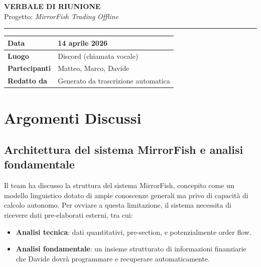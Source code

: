 \documentclass[12pt, a4paper]{article}
\begin{document}
\begin{center}
  {\LARGE\bfseries\color{primary} VERBALE DI RIUNIONE}\\[0.4cm]
  {\large Progetto: \textit{MirrorFish Trading Offline}}\\[0.2cm]
  \textcolor{darkgray}{\rule{0.6\textwidth}{0.4pt}}
\end{center}

\vspace{0.5cm}

\begin{center}
\begin{tabular}{>{\bfseries}p{4cm} p{9cm}}
\toprule
Data & 14 aprile 2026 \\
\midrule
Luogo & Discord (chiamata vocale) \\
\midrule
Partecipanti & Matteo, Marco, Davide \\
\midrule
Redatto da & Generato da trascrizione automatica \\
\bottomrule
\end{tabular}
\end{center}

\vspace{0.8cm}

\section{Argomenti Discussi}

\subsection{Architettura del sistema MirrorFish e analisi fondamentale}

Il team ha discusso la struttura del sistema MirrorFish, concepito come un modello linguistico dotato di ampie conoscenze generali ma privo di capacità di calcolo autonomo. Per ovviare a questa limitazione, il sistema necessita di ricevere dati pre-elaborati esterni, tra cui:

\begin{itemize}[leftmargin=1.5cm]
  \item \textbf{Analisi tecnica}: dati quantitativi, pre-section, e potenzialmente order flow.
  \item \textbf{Analisi fondamentale}: un insieme strutturato di informazioni finanziarie che Davide dovrà programmare e recuperare automaticamente.
\end{itemize}
\end{document}

